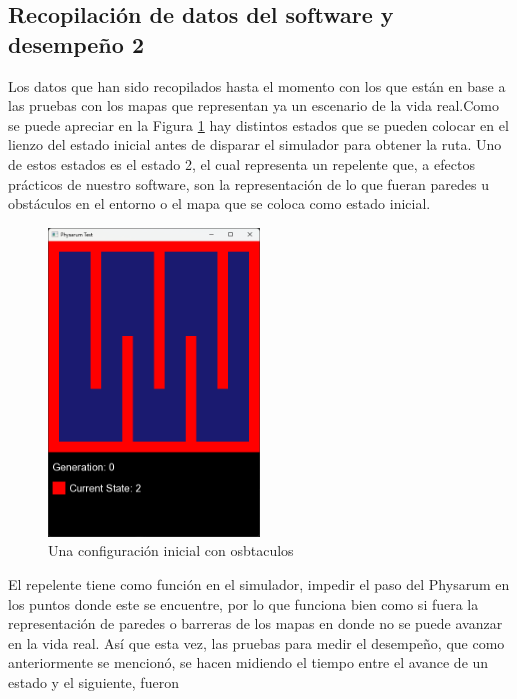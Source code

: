 \subsection{Recopilaci\'on de datos del software y desempe\~no 2}
    Los datos que han sido recopilados hasta el momento con los
        que est\'an en base a las pruebas con los mapas que
        representan ya un escenario de la vida real.Como se puede apreciar en la Figura \ref{fig:Ruta 59}
        hay distintos estados que se pueden colocar en el lienzo del
        estado inicial antes de disparar el simulador para obtener la
        ruta. Uno de estos estados es el estado 2, el cual representa
        un repelente que, a efectos pr\'acticos de nuestro software, son
        la representaci\'on de lo que fueran paredes u obst\'aculos en el
        entorno o el mapa que se coloca como estado inicial.
    \vskip 0.5cm
    \begin{figure}[htbp]
        \centering
        \includegraphics[width=0.5\textwidth]{./images/Pruebas/simulador/image059.png}
        \caption{Una configuraci\'on inicial con osbtaculos}
        \label{fig:Ruta 59}
    \end{figure}
    \vskip 0.5cm
    El repelente tiene como funci\'on en el simulador, impedir el
        paso del Physarum en los puntos donde este se encuentre,
        por lo que funciona bien como si fuera la representaci\'on de
        paredes o barreras de los mapas en donde no se puede
        avanzar en la vida real.
        \vskip 0.5cm
    As\'i que esta vez, las pruebas para medir el desempe\~no, que
        como anteriormente se mencion\'o, se hacen midiendo el
        tiempo entre el avance de un estado y el siguiente, fueron
